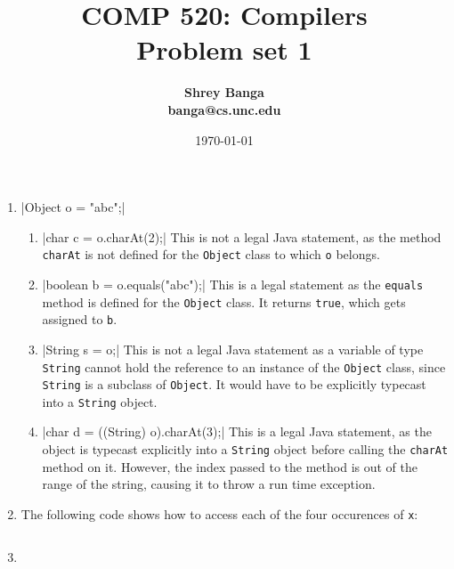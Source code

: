 \documentclass[a4paper,12pt]{article}
\title{COMP 520: Compilers\\{\bf Problem set 1}}
\author{\bf Shrey Banga\\banga@cs.unc.edu}
\date{\today}
\begin{document}
\maketitle

\begin{enumerate}

\item	{}|Object o = "abc";|
	\begin{enumerate} 

	\item {}|char c = o.charAt(2);|
	This is not a legal Java statement, as the method \texttt{charAt} is not defined for the \texttt{Object} class to which \texttt{o} belongs.

	\item {}|boolean b = o.equals("abc");|
	This is a legal statement as the \texttt{equals} method is defined for the \texttt{Object} class. It returns \texttt{true}, which gets assigned to \texttt{b}.

	\item {}|String s = o;|
	This is not a legal Java statement as a variable of type \texttt{String} cannot hold the reference to an instance of the \texttt{Object} class, since \texttt{String} is a subclass of \texttt{Object}. It would have to be explicitly typecast into a \texttt{String} object.

	\item {}|char d = ((String) o).charAt(3);|
	This is a legal Java statement, as the object is typecast explicitly into a \texttt{String} object before calling the \texttt{charAt} method on it. However, the index passed to the method is out of the range of the string, causing it to throw a run time exception.

	\end{enumerate}

\item The following code shows how to access each of the four occurences of \texttt{x}:\\
	\inputminted{java}{Test.java}

\item
	\inputminted{nasm}{gcd.asm}

\end{enumerate}
\end{document}

